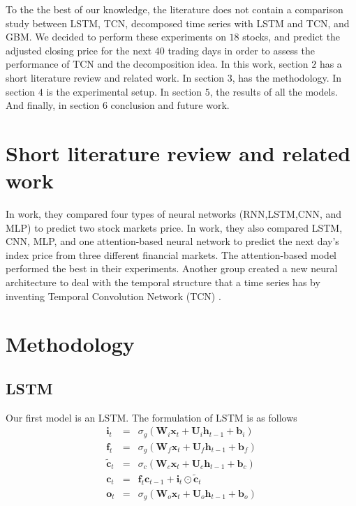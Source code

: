 \documentclass[12pt, A4]{article}
\begin{document}
To the the best of our knowledge, the literature does not contain a comparison study between LSTM, TCN, decomposed time series with LSTM and TCN, and GBM. We decided to perform these experiments on $18$ stocks, and predict the adjusted closing price for the next $40$ trading days in order to assess the performance of TCN and the decomposition idea. In this work, section $2$ has a short literature review and related work. In section $3$, has the methodology. In section $4$ is the experimental setup. In section $5$, the results of all the models. And finally, in section $6$ conclusion and future work.

\section{Short literature review and related work}

In \cite{hiransha2018nse} work, they compared four types of neural networks (RNN,LSTM,CNN, and MLP) to predict two stock markets price. In \cite{gao2020application} work, they also compared LSTM, CNN, MLP, and one attention-based neural network to predict the next day's index price from three different financial markets. The attention-based model performed the best in their experiments. Another group created a new neural architecture to deal with the temporal structure that a time series has by inventing Temporal Convolution Network (TCN)  \cite{lea2017temporal}. 

\section{Methodology}
\subsection{LSTM}
Our first model is an LSTM. The formulation of LSTM is as follows
\begin{eqnarray}
	\mathbf{i}_{t} &=& \sigma_{g}( \mathbf{W}_{i}\mathbf{x}_{t} + \mathbf{U}_{i}\mathbf{h}_{t-1} + \mathbf{b}_{i} ) \\
	\mathbf{f}_{t} &=& \sigma_{g}( \mathbf{W}_{f}\mathbf{x}_{t} + \mathbf{U}_{f}\mathbf{h}_{t-1} + \mathbf{b}_{f}  ) \\
	\tilde{\mathbf{c}}_{t} &=& \sigma_{c}( \mathbf{W}_{c}\mathbf{x}_{t} + \mathbf{U}_{c}\mathbf{h}_{t-1} + \mathbf{b}_{c}  ) \\
	\mathbf{c}_{t} &=& \mathbf{f}_{t}\mathbf{c}_{t-1} + \mathbf{i}_{t} \odot \tilde{\mathbf{c}}_{t} \\
	\mathbf{o}_{t} &=& \sigma_{g}(\mathbf{W}_{o}\mathbf{x}_{t} + \mathbf{U}_{o}\mathbf{h}_{t-1} + \mathbf{b}_{o} )
\end{eqnarray}
\end{document}
